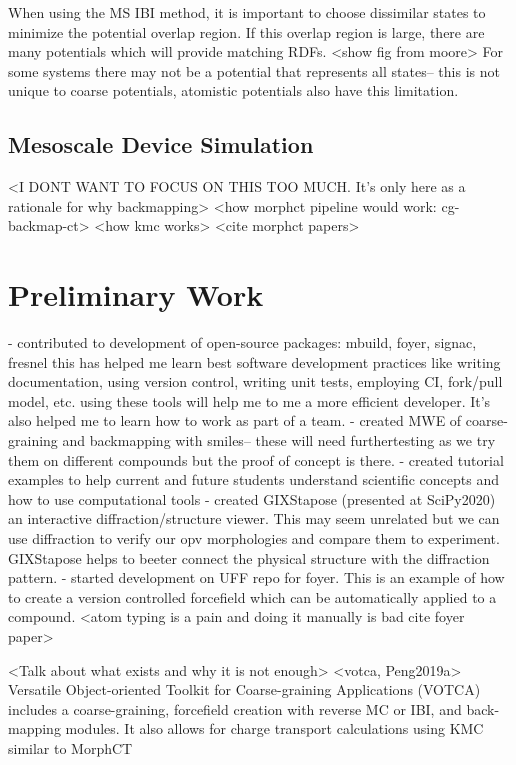When using the MS IBI method, it is important to choose dissimilar states to minimize the potential overlap region.
If this overlap region is large, there are many potentials which will provide matching RDFs. <show fig from moore>
For some systems there may not be a potential that represents all states-- this is not unique to coarse potentials, atomistic potentials also have this limitation.


\subsection*{Mesoscale Device Simulation}
<I DONT WANT TO FOCUS ON THIS TOO MUCH. It's only here as a rationale for why backmapping>
<how morphct pipeline would work: cg-backmap-ct>
<how kmc works>
<cite morphct papers>

\section*{Preliminary Work}
- contributed to development of open-source packages: mbuild, foyer, signac, fresnel
 this has helped me learn best software development practices like writing documentation, using version control, writing unit tests, employing CI, fork/pull model, etc.
using these tools will help me to me a more efficient developer.
It's also helped me to learn how to work as part of a team.
 - created MWE of coarse-graining and backmapping with smiles-- these will need furthertesting as we try them on different compounds but the proof of concept is there.
 - created tutorial examples to help current and future students understand scientific concepts and how to use computational tools
 - created GIXStapose (presented at SciPy2020) an interactive diffraction/structure viewer.
This may seem unrelated but we can use diffraction to verify our opv morphologies and compare them to experiment.
GIXStapose helps to beeter connect the physical structure with the diffraction pattern.
- started development on UFF repo for foyer.
This is an example of how to create a version controlled forcefield which can be automatically applied to a compound.
<atom typing is a pain and doing it manually is bad cite foyer paper>

<Talk about what exists and why it is not enough>
<votca, Peng2019a> 
Versatile Object-oriented Toolkit for Coarse-graining Applications (VOTCA) \cite{Ruhle2011b}
includes a coarse-graining, forcefield creation with reverse MC or IBI, and back-mapping modules.
It also allows for charge transport calculations using KMC similar to MorphCT \cite{Lukyanov2010}

